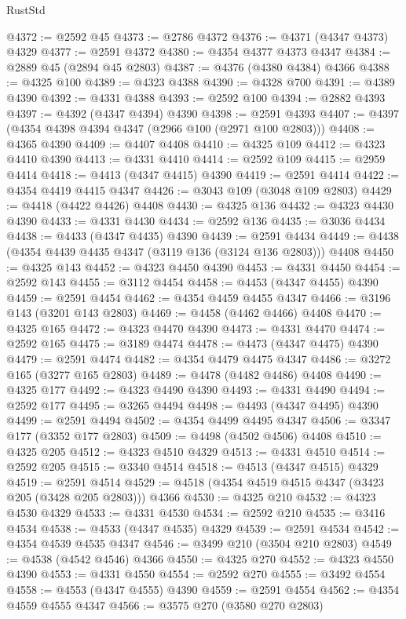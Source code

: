 \begin{lexlean}{RustStd}
\begin{coremodule}
@4372 := @2592 @45
@4373 := @2786 @4372
@4376 := @4371 (@4347 @4373) @4329
@4377 := @2591 @4372
@4380 := @4354 @4377 @4373 @4347
@4384 := @2889 @45 (@2894 @45 @2803)
@4387 := @4376 (@4380 @4384) @4366
@4388 := @4325 @100
@4389 := @4323 @4388
@4390 := @4328 @700
@4391 := @4389 @4390
@4392 := @4331 @4388
@4393 := @2592 @100
@4394 := @2882 @4393
@4397 := @4392 (@4347 @4394) @4390
@4398 := @2591 @4393
@4407 := @4397 (@4354 @4398 @4394 @4347 (@2966 @100 (@2971 @100 @2803)))
@4408 := @4365 @4390
@4409 := @4407 @4408
@4410 := @4325 @109
@4412 := @4323 @4410 @4390
@4413 := @4331 @4410
@4414 := @2592 @109
@4415 := @2959 @4414
@4418 := @4413 (@4347 @4415) @4390
@4419 := @2591 @4414
@4422 := @4354 @4419 @4415 @4347
@4426 := @3043 @109 (@3048 @109 @2803)
@4429 := @4418 (@4422 @4426) @4408
@4430 := @4325 @136
@4432 := @4323 @4430 @4390
@4433 := @4331 @4430
@4434 := @2592 @136
@4435 := @3036 @4434
@4438 := @4433 (@4347 @4435) @4390
@4439 := @2591 @4434
@4449 := @4438 (@4354 @4439 @4435 @4347 (@3119 @136 (@3124 @136 @2803))) @4408
@4450 := @4325 @143
@4452 := @4323 @4450 @4390
@4453 := @4331 @4450
@4454 := @2592 @143
@4455 := @3112 @4454
@4458 := @4453 (@4347 @4455) @4390
@4459 := @2591 @4454
@4462 := @4354 @4459 @4455 @4347
@4466 := @3196 @143 (@3201 @143 @2803)
@4469 := @4458 (@4462 @4466) @4408
@4470 := @4325 @165
@4472 := @4323 @4470 @4390
@4473 := @4331 @4470
@4474 := @2592 @165
@4475 := @3189 @4474
@4478 := @4473 (@4347 @4475) @4390
@4479 := @2591 @4474
@4482 := @4354 @4479 @4475 @4347
@4486 := @3272 @165 (@3277 @165 @2803)
@4489 := @4478 (@4482 @4486) @4408
@4490 := @4325 @177
@4492 := @4323 @4490 @4390
@4493 := @4331 @4490
@4494 := @2592 @177
@4495 := @3265 @4494
@4498 := @4493 (@4347 @4495) @4390
@4499 := @2591 @4494
@4502 := @4354 @4499 @4495 @4347
@4506 := @3347 @177 (@3352 @177 @2803)
@4509 := @4498 (@4502 @4506) @4408
@4510 := @4325 @205
@4512 := @4323 @4510 @4329
@4513 := @4331 @4510
@4514 := @2592 @205
@4515 := @3340 @4514
@4518 := @4513 (@4347 @4515) @4329
@4519 := @2591 @4514
@4529 := @4518 (@4354 @4519 @4515 @4347 (@3423 @205 (@3428 @205 @2803))) @4366
@4530 := @4325 @210
@4532 := @4323 @4530 @4329
@4533 := @4331 @4530
@4534 := @2592 @210
@4535 := @3416 @4534
@4538 := @4533 (@4347 @4535) @4329
@4539 := @2591 @4534
@4542 := @4354 @4539 @4535 @4347
@4546 := @3499 @210 (@3504 @210 @2803)
@4549 := @4538 (@4542 @4546) @4366
@4550 := @4325 @270
@4552 := @4323 @4550 @4390
@4553 := @4331 @4550
@4554 := @2592 @270
@4555 := @3492 @4554
@4558 := @4553 (@4347 @4555) @4390
@4559 := @2591 @4554
@4562 := @4354 @4559 @4555 @4347
@4566 := @3575 @270 (@3580 @270 @2803)

\end{coremodule}
\end{lexlean}

